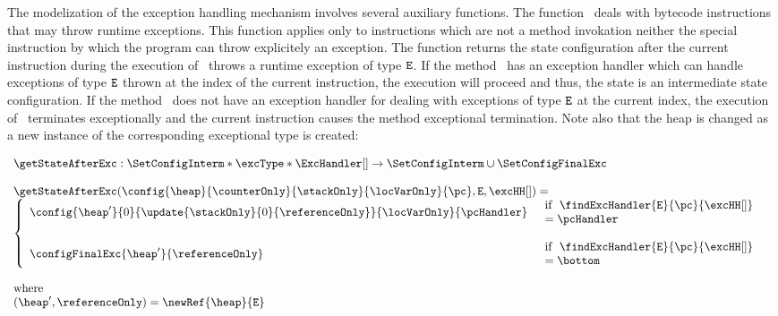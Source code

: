  The modelization of the exception handling mechanism involves several auxiliary functions. 
 The function \getStateAfterExc \ deals with bytecode instructions that may throw runtime exceptions.
 This function applies only to instructions which are not a method invokation neither the special instruction
 by which the program can throw explicitely an exception.
 The function returns the state  configuration after the current instruction during the execution of \methodd \ throws a runtime exception
 of type $\mbox{\rm\texttt{E}}$. If the  method \methodd \ has an  exception handler which can handle  exceptions of type
 $\mbox{\rm\texttt{E}}$ thrown at the index of the current  instruction,
 the execution will proceed and thus, the state is an intermediate state configuration.
 If the method \methodd \ does not have an exception handler for dealing with exceptions of type $\mbox{\rm\texttt{E}}$ 
 at the current index, the execution of \methodd \ terminates exceptionally and the current instruction
 causes the method exceptional termination. Note also that the heap is changed as a new instance of the corresponding exceptional 
 type is created:

 
 $$\begin{array}{l}
          \getStateAfterExc : \SetConfigInterm * \excType * \ExcHandler[] \rightarrow \SetConfigInterm \cup \SetConfigFinalExc  \\
	  \\
	  \getStateAfterExc( \config{\heap}{\counterOnly}{\stackOnly}{\locVarOnly}{\pc}, \mbox{\rm\texttt{E}},  \excHH[] ) = \\
          \left\{\begin{array}{ll}
	        \config{\heap'}{0}{\update{\stackOnly}{0}{\referenceOnly}}{\locVarOnly}{\pcHandler} & \begin{array}{l}  
                                                                                                           \mbox{\rm if \ \findExcHandler{\mbox{\rm\texttt{E}}}{\pc}{\excHH[]}} \\
													   =\pcHandler 
												      \end{array}	   
													   \\
		& \\
		\configFinalExc{\heap'}{\referenceOnly} & \begin{array}{l}     
		                                                             \mbox{\rm  if \ \findExcHandler{\mbox{\rm\texttt{E}}}{\pc}{\excHH[]} } \\
		                                                             = \bottom  
		                                                        \end{array}
	  \end{array}\right.\\
	  \\
        \mbox{\rm where }\\
	(\heap', \referenceOnly )= \newRef{\heap}{\mbox{\rm\texttt{E}}}
    \end{array}
 $$
 




